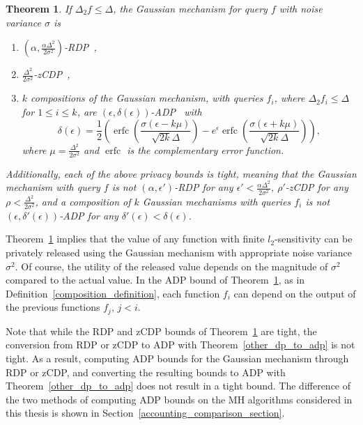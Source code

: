 \documentclass[english,twoside,openright]{HYgraduMLDS}
\newtheorem{theorem}[lemma]{Theorem}
\DeclareMathOperator{\erfc}{erfc}
\begin{document}
\begin{theorem}\label{gauss-DP-bounds}
  If \(\Delta_{2}f \leq \Delta\), the Gaussian mechanism for query \(f\) with
  noise variance \(\sigma\) is
    \begin{enumerate}
        \item 
            \((\alpha, \frac{\alpha \Delta^2}{2\sigma^2})\)-RDP~\cite{Mironov17},
        \item 
            \(\frac{\Delta^2}{2\sigma^2}\)-zCDP~\cite{BuS16},
        \item 
            \(k\) compositions of the Gaussian mechanism, with
            queries \(f_{i}\), where \(\Delta_{2}f_{i}\leq \Delta\) for
            \(1\leq i \leq k\), are
            \((\epsilon, \delta(\epsilon))\)-ADP~\cite{Sommer2019} with 
            \[
                \delta(\epsilon) 
                = \frac{1}{2}\left(
                    \erfc\left(\frac{\sigma(\epsilon - k\mu)}{\sqrt{2k}\Delta}\right)
                    - e^\epsilon \erfc\left(\frac{\sigma(\epsilon + k\mu)}{\sqrt{2k}\Delta}\right)
                \right),
            \]
            where \(\mu = \frac{\Delta^2}{2\sigma^2}\) and \(\erfc\) is 
            the complementary error function.
    \end{enumerate}
    Additionally, each of the above privacy bounds is tight, meaning that
    the Gaussian mechanism with query \(f\) is not \((\alpha, \epsilon')\)-RDP
    for any \(\epsilon' < \frac{\alpha\Delta^{2}}{2\sigma^{2}}\), \(\rho'\)-zCDP
    for any \(\rho < \frac{\Delta^{2}}{2\sigma^{2}}\), and a composition
    of \(k\) Gaussian mechanisms with queries \(f_{i}\) is not
    \((\epsilon, \delta'(\epsilon))\)-ADP for any
    \(\delta'(\epsilon) < \delta(\epsilon)\).
\end{theorem}

Theorem~\ref{gauss-DP-bounds} implies that the value of any function with
finite \(l_2\)-sensitivity can be privately released using the Gaussian mechanism
with appropriate noise variance \(\sigma^2\). Of course, the utility of the
released value depends on the magnitude of \(\sigma^2\) compared to the actual
value. In the ADP bound of Theorem~\ref{gauss-DP-bounds},
as in Definition~\ref{composition_definition}, each function \(f_{i}\)
can depend on the output of the previous functions \(f_{j}\), \(j < i\).

Note that while the RDP and zCDP bounds of Theorem~\ref{gauss-DP-bounds} are
tight, the conversion from RDP or zCDP to ADP with Theorem~\ref{other_dp_to_adp}
is not tight. As a result, computing
ADP bounds for the Gaussian mechanism through RDP or zCDP, and converting
the resulting bounds to ADP with Theorem~\ref{other_dp_to_adp} does not
result in a tight bound. The difference of the two methods of computing ADP bounds
on the MH algorithms considered in this thesis is shown in
Section~\ref{accounting_comparison_section}.
\end{document}
